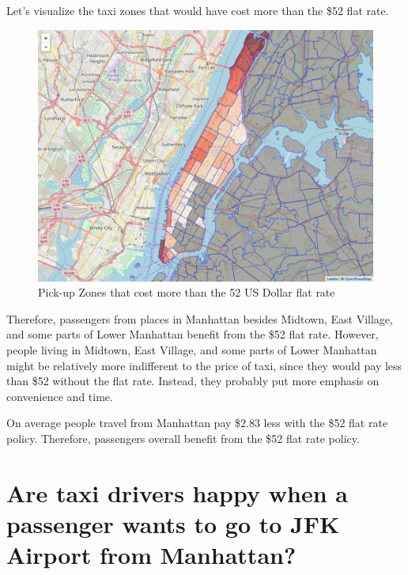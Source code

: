 \documentclass[12pt,twoside]{reedthesis}
\theoremstyle{definition}
\theoremstyle{definition}
\theoremstyle{definition}
\theoremstyle{remark}
\begin{document}
Let's visualize the taxi zones that would have cost more than the \$52
flat rate.
\begin{figure}

{\centering \includegraphics[width=5.84in]{figure/to_jfk_fare_above_vis} 

}

\caption{Pick-up Zones that cost more than the 52 US Dollar flat rate}\label{fig:to-jfk-fare-above-vis}
\end{figure}
Therefore, passengers from places in Manhattan besides Midtown, East
Village, and some parts of Lower Manhattan benefit from the \$52 flat
rate. However, people living in Midtown, East Village, and some parts of
Lower Manhattan might be relatively more indifferent to the price of
taxi, since they would pay less than \$52 without the flat rate.
Instead, they probably put more emphasis on convenience and time.

On average people travel from Manhattan pay \$2.83 less with the \$52
flat rate policy. Therefore, passengers overall benefit from the \$52
flat rate policy.

\section{Are taxi drivers happy when a passenger wants to go to JFK
Airport from
Manhattan?}\label{are-taxi-drivers-happy-when-a-passenger-wants-to-go-to-jfk-airport-from-manhattan}
\end{document}
